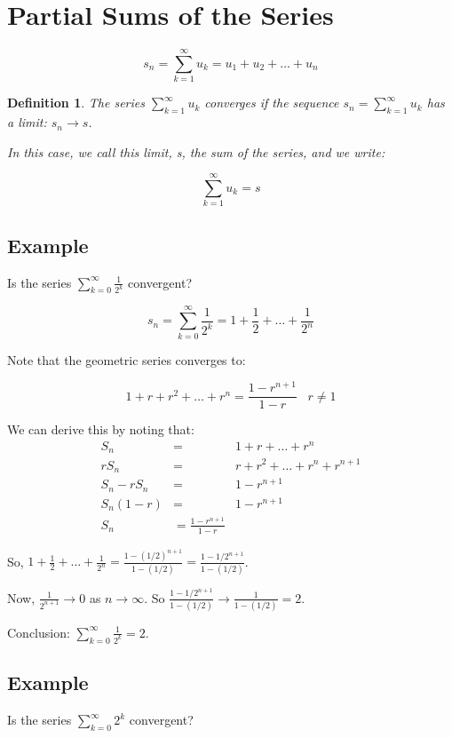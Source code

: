 \documentclass[12pt]{scrbook}
\newtheorem*{definition}{Definition}
\begin{document}
\section{Partial Sums of the Series}

\[ s_n = \sum_{k=1}^{\infty} u_k = u_1 + u_2 + \ldots + u_n \]

\begin{definition}
The series $\sum_{k=1}^{\infty} u_k$ converges if the sequence $s_n = \sum_{k=1}^{\infty} u_k$ has a limit: 
$s_n \rightarrow s$.

In this case, we call this limit, s, the sum of the series, and we write:

\[  \sum_{k=1}^{\infty} u_k = s \]
\end{definition}

\subsection{Example}
Is the series $\sum_{k=0}^{\infty} \frac{1}{2^k} $
convergent?

\[ s_n = \sum_{k=0}^{\infty} \frac{1}{2^k} = 1 + \frac{1}{2} + \ldots
+ \frac{1}{2^n}  \]

Note that the geometric series converges to:

\[ 1 + r + r^2 + \ldots + r^n = \frac{1 - r^{n+1}}{1 - r} \;\;\; r
\neq 1 \]

We can derive this by noting that:
\begin{eqnarray*}
S_n           &=& 1 + r + \ldots + r^n \\
rS_n          &=& r + r^2 + \ldots + r^n  + r^{n+1} \\
S_n - rS_n &=& 1 - r^{n+1} \\
S_n(1-r)    &=& 1-r^{n+1} \\
S_n           &= \frac{1 - r^{n+1}}{1 - r} 
\end{eqnarray*}

So, $ 1 + \frac{1}{2} + \ldots + \frac{1}{2^n} = \frac{1 -
  (1/2)^{n+1}}{1 - (1/2)} = \frac{1 - 1/2^{n+1}}{1-(1/2)} $.  

Now,
$\frac{1}{2^{n+1}} \rightarrow 0$ as $n \rightarrow \infty$.  So $
\frac{1 - 1/2^{n+1}}{1-(1/2)} \rightarrow \frac{1}{1-(1/2)} = 2$.

Conclusion: $\sum_{k=0}^{\infty} \frac{1}{2^k}  = 2$.

\subsection{Example}
Is the series $\sum_{k=0}^{\infty} {2^k} $ convergent?
\end{document}
